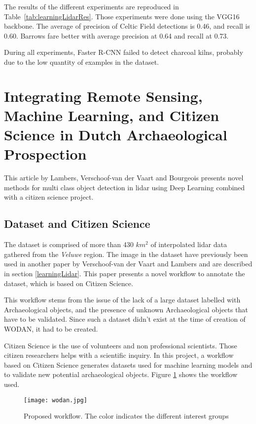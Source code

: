 The results of the different experiments are reproduced in Table~\ref{tab:learningLidarRes}. Those experiments were done using the VGG16 backbone. The average of precision of Celtic Field detections is 0.46, and recall is 0.60. Barrows fare better with average precision at 0.64 and recall at 0.73.

During all experiments, Faster R-CNN failed to detect charcoal kilns, probably due to the low quantity of examples in the dataset. 

\section{Integrating Remote Sensing, Machine Learning, and Citizen Science in Dutch Archaeological Prospection}\label{heritageQuest}

This article by Lambers, Verschoof-van der Vaart and Bourgeois\cite{lamberVerschoof2019} presents novel methods for multi class object detection in \gls{lidar} using Deep Learning combined with a citizen science project. 


\subsection{Dataset and Citizen Science}
The dataset is comprised of more than 430 $km^2$ of interpolated \gls{lidar} data gathered from the \textit{Veluwe} region. The image in the dataset have previously been used in another paper by Verschoof-van der Vaart and Lambers \cite{wouter2019} and are described in section \ref{learningLidar}. This paper presents a novel workflow to annotate the dataset, which is based on Citizen Science. 

This workflow stems from the issue of the lack of a large dataset labelled with Archaeological objects, and the presence of unknown Archaeological objects that have to be validated. Since such a dataset didn't exist at the time of creation of WODAN, it had to be created. 

Citizen Science is the use of volunteers and non professional scientists. Those citizen researchers helps with a scientific inquiry. In this project, a workflow based on Citizen Science generates datasets used for machine learning models and to validate new potential archaeological objects. Figure \ref{wodanApproach} shows the workflow used.

\begin{figure}[H]
  \centering
	\texttt{[image: wodan.jpg]}
	\caption[]{Proposed workflow. The color indicates the different interest groups}
  \label{wodanApproach}
\end{figure}

